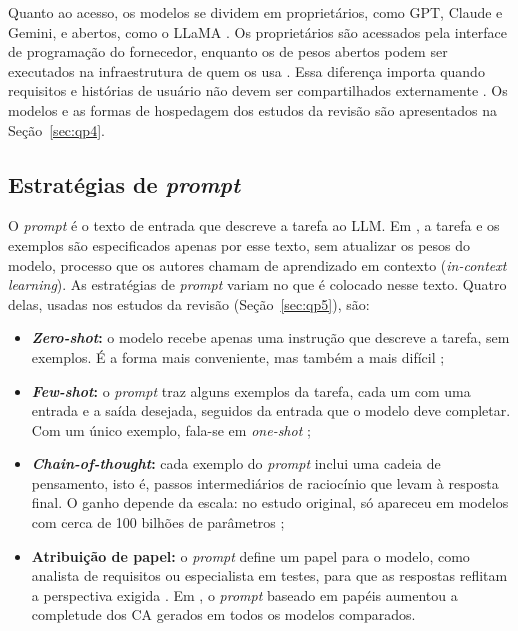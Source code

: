 Quanto ao acesso, os modelos se dividem em proprietários, como GPT, Claude e Gemini, e abertos, como o LLaMA \cite{cheng2026} . Os proprietários são acessados pela interface de programação do fornecedor, enquanto os de pesos abertos podem ser executados na infraestrutura de quem os usa \cite{huang2026}. Essa diferença importa quando requisitos e histórias de usuário não devem ser compartilhados externamente \cite{zyberaj2026}. Os modelos e as formas de hospedagem dos estudos da revisão são apresentados na Seção~\ref{sec:qp4}.

\subsection{Estratégias de \textit{prompt}}
\label{sec:tecnicas-llm}

O \textit{prompt} é o texto de entrada que descreve a tarefa ao LLM. Em , a tarefa e os exemplos são especificados apenas por esse texto, sem atualizar os pesos do modelo, processo que os autores chamam de aprendizado em contexto (\textit{in-context learning}). As estratégias de \textit{prompt} variam no que é colocado nesse texto. Quatro delas, usadas nos estudos da revisão (Seção~\ref{sec:qp5}), são:

\begin{itemize}
  \item \textbf{\textit{Zero-shot}:} o modelo recebe apenas uma instrução que descreve a tarefa, sem exemplos. É a forma mais conveniente, mas também a mais difícil \cite{brown2020};
  \item \textbf{\textit{Few-shot}:} o \textit{prompt} traz alguns exemplos da tarefa, cada um com uma entrada e a saída desejada, seguidos da entrada que o modelo deve completar. Com um único exemplo, fala-se em \textit{one-shot} \cite{brown2020};
  \item \textbf{\textit{Chain-of-thought}:} cada exemplo do \textit{prompt} inclui uma cadeia de pensamento, isto é, passos intermediários de raciocínio que levam à resposta final. O ganho depende da escala: no estudo original, só apareceu em modelos com cerca de 100 bilhões de parâmetros \cite{wei2022};
  \item \textbf{Atribuição de papel:} o \textit{prompt} define um papel para o modelo, como analista de requisitos ou especialista em testes, para que as respostas reflitam a perspectiva exigida \cite{zhang2024}. Em , o \textit{prompt} baseado em papéis aumentou a completude dos CA gerados em todos os modelos comparados.
\end{itemize}

